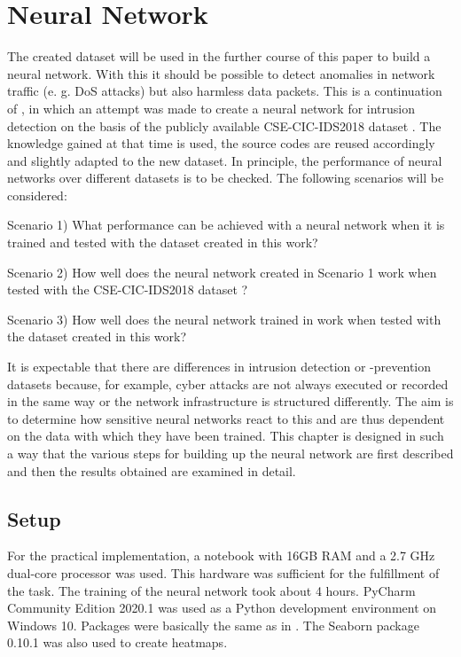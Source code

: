 \documentclass[conference]{IEEEtran}
\begin{document}
\section{Neural Network}\label{nn}
The created dataset will be used in the further course of this paper to build a neural network. With this it should be possible to detect anomalies in network traffic (e. g. DoS attacks) but also harmless data packets. This is a continuation of  \cite{max1}, in which an attempt was made to create a neural network for intrusion detection on the basis of the publicly available CSE-CIC-IDS2018 dataset  \cite{max2}. The knowledge gained at that time is used, the source codes are reused accordingly and slightly adapted to the new dataset. In principle, the performance of neural networks over different datasets is to be checked. The following scenarios will be considered:
\smallskip

Scenario 1) What performance can be achieved with a neural network when it is trained and tested with the dataset created in this work? 
\smallskip

Scenario 2) How well does the neural network created in Scenario 1 work when tested with the CSE-CIC-IDS2018 dataset  \cite{max2}? 
\smallskip

Scenario 3) How well does the neural network trained in \cite{max1} work when tested with the dataset created in this work?
\smallskip

It is expectable that there are differences in intrusion detection or -prevention datasets because, for example, cyber attacks are not always executed or recorded in the same way or the network infrastructure is structured differently. The aim is to determine how sensitive neural networks react to this and are thus dependent on the data with which they have been trained. This chapter is designed in such a way that the various steps for building up the neural network are first described and then the results obtained are examined in detail.

\subsection{Setup}
For the practical implementation, a notebook with 16GB RAM and a 2.7 GHz dual-core processor was used. This hardware was sufficient for the fulfillment of the task. The training of the neural network took about 4 hours. PyCharm Community Edition 2020.1 was used as a Python development environment on Windows 10. Packages were basically the same as in \cite{max1}. The Seaborn package 0.10.1 was also used to create heatmaps.
\end{document}
